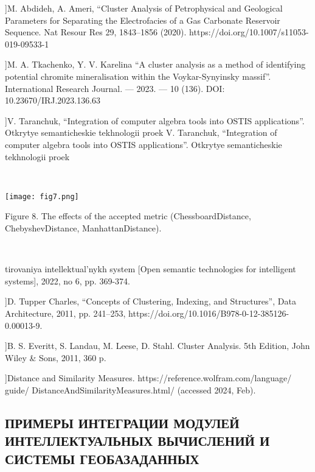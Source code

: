 \documentclass [10pt, letterpaper]{article}
\begin{document}
\begin{multicols}{2}
\begin{thebibliography}{10}
{{{  \item[[5]]M. Abdideh, A. Ameri, “Cluster Analysis of Petrophysical and
Geological Parameters for Separating the Electrofacies of a Gas
Carbonate Reservoir Sequence. Nat Resour Res 29, 1843–1856
(2020). https://doi.org/10.1007/s11053-019-09533-1

  \item[[6]]M. A. Tkachenko, Y. V. Karelina “A cluster analysis as a
method of identifying potential chromite mineralisation within
the Voykar-Synyinsky massif”. International Research Journal. —
2023. — 10 (136). DOI: 10.23670/IRJ.2023.136.63
  \item[[7]]V. Taranchuk, “Integration of computer algebra tools into OSTIS applications”. Otkrytye semanticheskie tekhnologii proek V. Taranchuk, “Integration of computer algebra tools into OSTIS applications”. Otkrytye semanticheskie tekhnologii proek}}\\
  
  \columbreak

 
\begin{minipage}{.4\textwidth}
\texttt{[image: fig7.png]}
\caption{Figure 8. The effects of the accepted metric (ChessboardDistance,
ChebyshevDistance, ManhattanDistance).}
\end{minipage}
\vspace{8 mm}\\

\small{tirovaniya intellektual’nykh system [Open semantic technologies
for intelligent systems], 2022, no 6, pp. 369-374.
  \item[[8]]D. Tupper Charles, “Concepts of Clustering, Indexing,
and Structures”, Data Architecture, 2011, pp. 241–253,
https://doi.org/10.1016/B978-0-12-385126-0.00013-9.
  \item[[9]]B. S. Everitt, S. Landau, M. Leese, D. Stahl. Cluster Analysis.
5th Edition, John Wiley & Sons, 2011, 360 p.
  \item[[10]]Distance and Similarity Measures.
https://reference.wolfram.com/language/ guide/ DistanceAndSimilarityMeasures.html/ (accessed 2024, Feb).}}
\end{thebibliography}

\begin{center}

    \section*{\normalsize{ПРИМЕРЫ ИНТЕГРАЦИИ МОДУЛЕЙ
ИНТЕЛЛЕКТУАЛЬНЫХ ВЫЧИСЛЕНИЙ И
СИСТЕМЫ ГЕОБАЗАДАННЫХ}}

\end{center}
\end{multicols}
\end{document}
